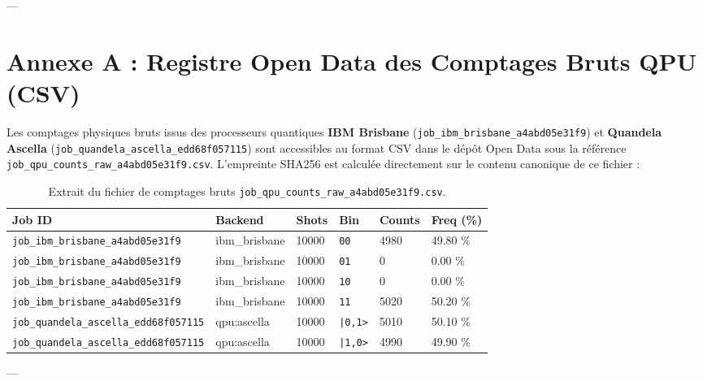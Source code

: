 \documentclass[12pt,a4paper]{article}
\begin{document}
---

\appendix
\section{Annexe A : Registre Open Data des Comptages Bruts QPU (CSV)}
\label{sec:annexe_csv}

Les comptages physiques bruts issus des processeurs quantiques \textbf{IBM Brisbane} (\texttt{job\_ibm\_brisbane\_a4abd05e31f9}) et \textbf{Quandela Ascella} (\texttt{job\_quandela\_ascella\_edd68f057115}) sont accessibles au format CSV dans le dépôt Open Data sous la référence \texttt{job\_qpu\_counts\_raw\_a4abd05e31f9.csv}. L'empreinte SHA256 est calculée directement sur le contenu canonique de ce fichier :

\begin{table}[H]
\centering
\caption{Extrait du fichier de comptages bruts \texttt{job\_qpu\_counts\_raw\_a4abd05e31f9.csv}.}
\label{tab:csv_raw}
\small
\begin{tabular}{llllll}
\toprule
\textbf{Job ID} & \textbf{Backend} & \textbf{Shots} & \textbf{Bin} & \textbf{Counts} & \textbf{Freq (\%)} \\
\midrule
\texttt{job\_ibm\_brisbane\_a4abd05e31f9} & ibm\_brisbane & 10000 & \texttt{00} & 4980 & 49.80 \% \\
\texttt{job\_ibm\_brisbane\_a4abd05e31f9} & ibm\_brisbane & 10000 & \texttt{01} & 0 & 0.00 \% \\
\texttt{job\_ibm\_brisbane\_a4abd05e31f9} & ibm\_brisbane & 10000 & \texttt{10} & 0 & 0.00 \% \\
\texttt{job\_ibm\_brisbane\_a4abd05e31f9} & ibm\_brisbane & 10000 & \texttt{11} & 5020 & 50.20 \% \\
\midrule
\texttt{job\_quandela\_ascella\_edd68f057115} & qpu:ascella & 10000 & \texttt{|0,1>} & 5010 & 50.10 \% \\
\texttt{job\_quandela\_ascella\_edd68f057115} & qpu:ascella & 10000 & \texttt{|1,0>} & 4990 & 49.90 \% \\
\bottomrule
\end{tabular}
\end{table}

---
\end{document}
